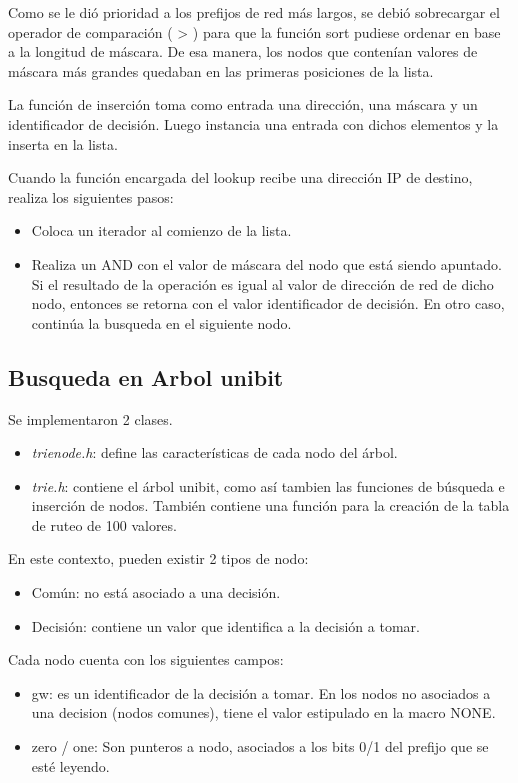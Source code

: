 Como se le dió prioridad a los prefijos de red más largos, se debió sobrecargar el operador de comparación ( > ) para que la función sort pudiese ordenar en base a la longitud de máscara. De esa manera, los nodos que contenían valores de máscara más grandes quedaban en las primeras posiciones de la lista.

La función de inserción toma como entrada una dirección, una máscara y un identificador de decisión. Luego instancia una entrada con dichos elementos y la inserta en la lista.

Cuando la función encargada del lookup recibe una dirección IP de destino, realiza los siguientes pasos:

\begin{itemize}
	\item Coloca un iterador al comienzo de la lista.
	\item Realiza un AND con el valor de máscara del nodo que está siendo apuntado. Si el resultado de la operación es igual al valor de dirección de red de dicho nodo, entonces se retorna con el valor identificador de decisión. En otro caso, continúa la busqueda en el siguiente nodo.
\end{itemize}

\subsection {Busqueda en Arbol unibit}

Se implementaron 2 clases. 

\begin{itemize}
	\item \textit{trienode.h}: define las características de cada nodo del árbol.
	\item \textit{trie.h}: contiene el árbol unibit, como así tambien las funciones de búsqueda e inserción de nodos. También contiene una función para la creación de la tabla de ruteo de 100 valores.
\end{itemize}


En este contexto, pueden existir 2 tipos de nodo:

\begin{itemize}
	\item Común: no está asociado a una decisión.
	\item Decisión: contiene un valor que identifica a la decisión a tomar. 
\end{itemize}

Cada nodo cuenta con los siguientes campos:
\begin{itemize}
	\item gw: es un identificador de la decisión a tomar. En los nodos no asociados a una decision (nodos comunes), tiene el valor estipulado en la macro NONE.
    \item zero / one: Son punteros a nodo, asociados a los bits 0/1 del prefijo que se esté leyendo.

\end{itemize}

